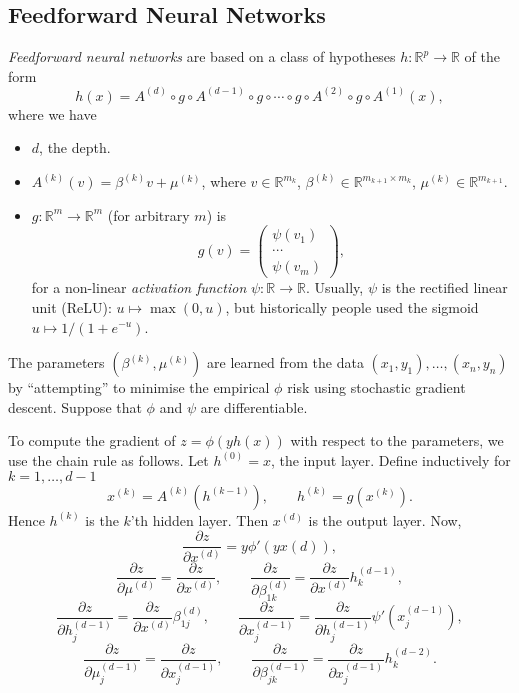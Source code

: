 \documentclass[12pt]{article}
\begin{document}
\subsection{Feedforward Neural Networks}
\label{sub:nn}

\emph{Feedforward neural networks} are based on a class of hypotheses $h : \mathbb{R}^p \to \mathbb{R}$ of the form
\[
h(x) = A^{(d)} \circ g \circ A^{(d-1)} \circ g \circ \cdots \circ g \circ A^{(2)} \circ g \circ A^{(1)} (x),
\]
where we have
\begin{itemize}
	\item $d$, the depth.
	\item $A^{(k)}(v) = \beta^{(k)} v + \mu^{(k)}$, where $v \in \mathbb{R}^{m_k}$, $\beta^{(k)} \in \mathbb{R}^{m_{k+1} \times m_k}$, $\mu^{(k)} \in \mathbb{R}^{m_{k+1}}$.
	\item $g : \mathbb{R}^m \to \mathbb{R}^m$ (for arbitrary $m$) is
		\[
		g(v) = 
		\begin{pmatrix}
			\psi(v_1) \\ \cdots \\ \psi(v_m)
		\end{pmatrix},
		\]
		for a non-linear \emph{activation function} $\psi : \mathbb{R} \to \mathbb{R}$. Usually, $\psi$ is the rectified linear unit (ReLU): $u \mapsto \max(0, u)$, but historically people used the sigmoid $u \mapsto 1/(1 + e^{-u})$.
\end{itemize}

The parameters $(\beta^{(k)}, \mu^{(k)})$ are learned from the data $(x_1, y_1), \ldots, (x_n, y_n)$ by ``attempting'' to minimise the empirical $\phi$ risk using stochastic gradient descent. Suppose that $\phi$ and $\psi$ are differentiable.

To compute the gradient of $z = \phi(y h(x))$ with respect to the parameters, we use the chain rule as follows. Let $h^{(0)} = x$, the input layer. Define inductively for $k = 1, \ldots, d-1$
\[
x^{(k)} = A^{(k)}( h^{(k-1)}), \qquad h^{(k)} = g(x^{(k)}).
\]
Hence $h^{(k)}$ is the $k$'th hidden layer. Then $x^{(d)}$ is the output layer. Now,
\[
\frac{\partial z}{\partial x^{(d)}} = y \phi' (y x(d)),
\]
\[
\frac{\partial z}{\partial \mu^{(d)}} = \frac{\partial z}{\partial x^{(d)}}, \qquad \frac{\partial z}{\partial \beta^{(d)}_{1k}} = \frac{\partial z}{\partial x^{(d)}} h^{(d-1)}_k,
\]
\[
\frac{\partial z}{\partial h^{(d-1)}_j} = \frac{\partial z}{\partial x^{(d)}} \beta_{1j}^{(d)}, \qquad \frac{\partial z}{\partial x_{j}^{(d-1)}} = \frac{\partial z}{\partial h_j^{(d-1)}} \psi'(x_j^{(d-1)}),
\]
\[
	\frac{\partial z}{\partial \mu^{(d-1)}_j} = \frac{\partial z}{\partial x_j ^{(d-1)}}, \qquad \frac{\partial z}{\partial \beta^{(d-1)}_{jk}} = \frac{\partial z}{\partial x_j^{(d-1)}} h_k^{(d-2)}.
\]



\printindex
\end{document}
